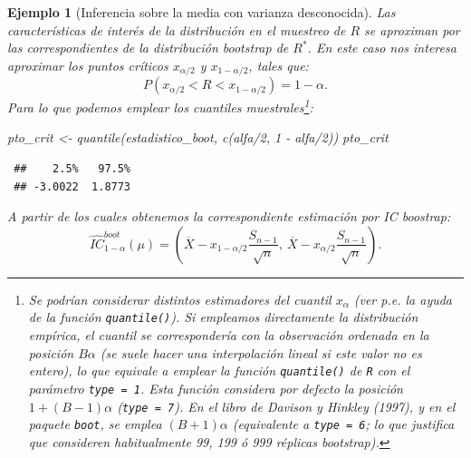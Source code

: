 \documentclass[
  10pt,
]{book}
\newenvironment{Shaded}{\begin{snugshade}}{\end{snugshade}}
\newcommand{\DecValTok}[1]{\textcolor[rgb]{0.00,0.00,0.81}{#1}}
\newcommand{\FunctionTok}[1]{\textcolor[rgb]{0.00,0.00,0.00}{#1}}
\newcommand{\NormalTok}[1]{#1}
\newcommand{\OtherTok}[1]{\textcolor[rgb]{0.56,0.35,0.01}{#1}}
\newcommand{\SpecialCharTok}[1]{\textcolor[rgb]{0.00,0.00,0.00}{#1}}
\theoremstyle{break}
\newtheorem{example}{Ejemplo}[chapter]
\theoremstyle{nonumberplain}
\let\oldfootnote\footnote
\renewcommand\footnote[1]{\oldfootnote{\hspace{2mm}#1}}
\begin{document}
\begin{example}[Inferencia sobre la media con varianza desconocida]
Las características de interés de la distribución en el muestreo de \(R\)
se aproximan por las correspondientes de la distribución bootstrap de \(R^{\ast}\).
En este caso nos interesa aproximar los puntos críticos \(x_{\alpha /2}\) y
\(x_{1-\alpha /2}\), tales que:
\[P\left( x_{\alpha /2} < R < x_{1-\alpha /2} \right) = 1-\alpha.\]
Para lo que podemos emplear los cuantiles muestrales\footnote{
  Se podrían considerar distintos estimadores del cuantil \(x_{\alpha}\)
  (ver p.e. la ayuda de la función \texttt{quantile()}).
  Si empleamos directamente la distribución empírica, el cuantil se
  correspondería con la observación ordenada en la posición \(B \alpha\)
  (se suele hacer una interpolación lineal si este valor no es entero),
  lo que equivale a emplear la función \texttt{quantile()} de \texttt{R} con el parámetro
  \texttt{type\ =\ 1}. Esta función considera por defecto la posición
  \(1 + (B - 1) \alpha\) (\texttt{type\ =\ 7}).
  En el libro de Davison y Hinkley (1997), y en el paquete \texttt{boot}, se emplea \((B + 1) \alpha\) (equivalente a \texttt{type\ =\ 6}; lo que justifica que
  consideren habitualmente 99, 199 ó 999 réplicas bootstrap).}:

\begin{Shaded}
\begin{Highlighting}[]
\NormalTok{pto\_crit }\OtherTok{\textless{}{-}} \FunctionTok{quantile}\NormalTok{(estadistico\_boot, }\FunctionTok{c}\NormalTok{(alfa}\SpecialCharTok{/}\DecValTok{2}\NormalTok{, }\DecValTok{1} \SpecialCharTok{{-}}\NormalTok{ alfa}\SpecialCharTok{/}\DecValTok{2}\NormalTok{))}
\NormalTok{pto\_crit}
\end{Highlighting}
\end{Shaded}

\begin{verbatim}
 ##    2.5%   97.5% 
 ## -3.0022  1.8773
\end{verbatim}

A partir de los cuales obtenemos la correspondiente estimación por IC boostrap:
\[\hat{IC}^{boot}_{1-\alpha}\left(  \mu\right)  = 
\left(  \overline{X}-x_{1-\alpha/2}\dfrac{S_{n-1}}{\sqrt{n}},\ \overline{X} 
- x_{\alpha/2}\dfrac{S_{n-1}}{\sqrt{n}} \right).\]


\end{example}
\end{document}
